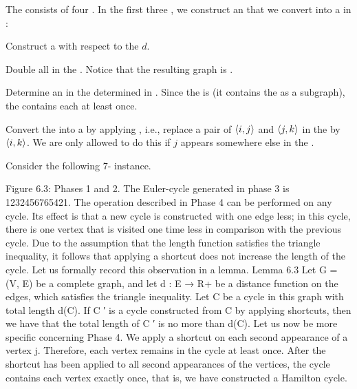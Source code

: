 The  consists of four . In the first three , we construct an  that we convert into a  in :

\begin{phasenum}
 \item {} Construct a  with respect to the  $d$.
 \item {} Double all  in the . Notice that the resulting graph is .
 \item {} Determine an  in the  determined in . Since the  is  (it contains the  as a subgraph), the  contains each  at least once.
 \item {} Convert the  into a  by applying , i.e., replace a pair of  $\left\langle i,j \right\rangle$ and $\left\langle j, k \right\rangle$ in the  by $\left\langle i,k \right\rangle$. We are only allowed to do this if $j$ appears somewhere else in the .
\end{phasenum}

\begin{example}
Consider the following $7$-  instance.
\end{example}



Figure 6.3: Phases 1 and 2.
The Euler-cycle generated in phase 3 is 1232456765421.
The operation described in Phase 4 can be performed on any cycle. Its effect is that a new cycle is
constructed with one edge less; in this cycle, there is one vertex that is visited one time less in comparison
with the previous cycle. Due to the assumption that the length function satisfies the triangle inequality,
it follows that applying a shortcut does not increase the length of the cycle. Let us formally record this
observation in a lemma.
Lemma 6.3 Let G = (V, E) be a complete graph, and let d : E → R+ be a distance function on the
edges, which satisfies the triangle inequality. Let C be a cycle in this graph with total length d(C). If C ′
is a cycle constructed from C by applying shortcuts, then we have that the total length of C ′ is no more
than d(C).
Let us now be more specific concerning Phase 4. We apply a shortcut on each second appearance of a
vertex j. Therefore, each vertex remains in the cycle at least once. After the shortcut has been applied
to all second appearances of the vertices, the cycle contains each vertex exactly once, that is, we have
constructed a Hamilton cycle.

